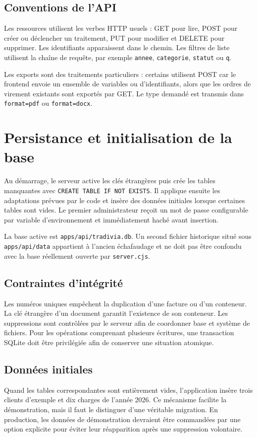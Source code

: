 \documentclass[12pt,a4paper,oneside]{report}
\newcommand{\code}[1]{\texttt{#1}}
\begin{document}
\subsection{Conventions de l'API}
Les ressources utilisent les verbes HTTP usuels : GET pour lire, POST pour créer ou déclencher un traitement, PUT pour modifier et DELETE pour supprimer. Les identifiants apparaissent dans le chemin. Les filtres de liste utilisent la chaîne de requête, par exemple \code{annee}, \code{categorie}, \code{statut} ou \code{q}.

Les exports sont des traitements particuliers : certains utilisent POST car le frontend envoie un ensemble de variables ou d'identifiants, alors que les ordres de virement existants sont exportés par GET. Le type demandé est transmis dans \code{format=pdf} ou \code{format=docx}.

\section{Persistance et initialisation de la base}
Au démarrage, le serveur active les clés étrangères puis crée les tables manquantes avec \code{CREATE TABLE IF NOT EXISTS}. Il applique ensuite les adaptations prévues par le code et insère des données initiales lorsque certaines tables sont vides. Le premier administrateur reçoit un mot de passe configurable par variable d'environnement et immédiatement haché avant insertion.

La base active est \code{apps/api/tradivia.db}. Un second fichier historique situé sous \code{apps/api/data} appartient à l'ancien échafaudage et ne doit pas être confondu avec la base réellement ouverte par \code{server.cjs}.

\subsection{Contraintes d'intégrité}
Les numéros uniques empêchent la duplication d'une facture ou d'un conteneur. La clé étrangère d'un document garantit l'existence de son conteneur. Les suppressions sont contrôlées par le serveur afin de coordonner base et système de fichiers. Pour les opérations comprenant plusieurs écritures, une transaction SQLite doit être privilégiée afin de conserver une situation atomique.

\subsection{Données initiales}
Quand les tables correspondantes sont entièrement vides, l'application insère trois clients d'exemple et dix charges de l'année 2026. Ce mécanisme facilite la démonstration, mais il faut le distinguer d'une véritable migration. En production, les données de démonstration devraient être commandées par une option explicite pour éviter leur réapparition après une suppression volontaire.
\end{document}
